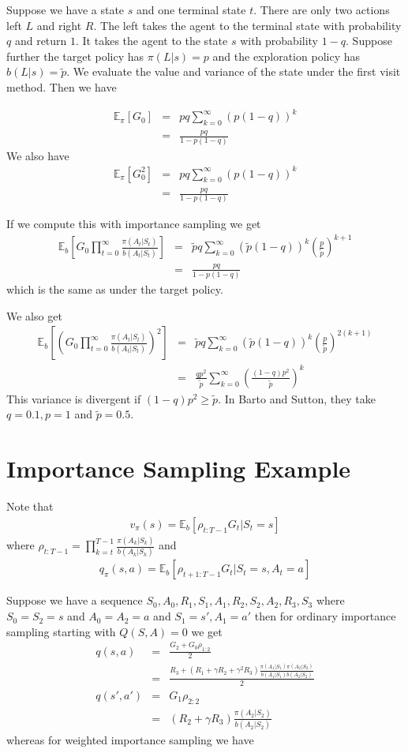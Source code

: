 \documentclass[11pt,a4paper]{article}
\newcommand\bea{\begin{eqnarray}}
\newcommand\eea{\end{eqnarray}}
\newcommand{\nn}{\nonumber \\}
\begin{document}
Suppose we have a state $s$ and one terminal state $t$. There are only two actions left $L$ and right $R$. The left takes the agent to the terminal state with probability $q$ and return $1$. It takes the agent to the state $s$ with probability $1-q$. Suppose further the target policy has $\pi(L|s)=p$ and the exploration policy has $b(L|s)=\tilde p$. We evaluate the value and variance of the state under the first visit method. Then we have

\bea
\mathbb E_\pi[G_0] &=& pq \sum_{k=0}^\infty (p (1-q))^k \nn
&=& \frac{pq}{1-p(1-q)}
\eea
We also have
\bea
\mathbb E_\pi[G_0^2] &=& pq \sum_{k=0}^\infty (p (1-q))^k \nn
&=& \frac{pq}{1-p(1-q)}
\eea

If we compute this with importance sampling we get
\bea
\mathbb E_b[G_0 \prod_{t=0}^\infty \frac{\pi(A_t|S_t)}{b(A_t|S_t)}] &=& \tilde pq \sum_{k=0}^\infty (\tilde p (1-q))^k \left( \frac{p}{\tilde p} \right)^{k+1} \nn
&=& \frac{pq}{1-p(1-q)}
\eea
which is the same as under the target policy.

We also get
\bea
\mathbb E_b[\left(G_0 \prod_{t=0}^\infty \frac{\pi(A_t|S_t)}{b(A_t|S_t)}\right)^2] &=& \tilde pq \sum_{k=0}^\infty (\tilde p (1-q))^k \left( \frac{p}{\tilde p} \right)^{2(k+1)} \nn
&=& \frac{qp^2}{\tilde p} \sum_{k=0}^\infty \left( \frac{(1-q) p^2}{\tilde p}\right)^k
\eea
This variance is divergent if $(1-q)p^2 \ge \tilde p$. In Barto and Sutton, they take $q=0.1, p=1$ and $\tilde p=0.5$.







\section{Importance Sampling Example}
Note that
\bea
v_\pi(s) = \mathbb E_b [ \rho_{t:T-1} G_t | S_t=s]
\eea
where $\rho_{t:T-1} = \prod_{k=t}^{T-1} \frac{\pi(A_k|S_k)}{b(A_k|S_k)}$ and
\bea
q_\pi(s,a) = \mathbb E_b [ \rho_{t+1:T-1} G_t | S_t=s, A_t=a]
\eea


Suppose we have a sequence $S_0,A_0,R_1,S_1,A_1,R_2,S_2,A_2,R_3,S_3$ where $S_0=S_2=s$ and $A_0=A_2=a$ and $S_1=s',A_1=a'$ then for ordinary importance sampling starting with $Q(S,A)=0$ we get
\bea
q(s,a) &=& \frac{G_2 + G_0 \rho_{1:2}}{2} \nn
&=&  \frac{ R_3 + (R_1 + \gamma R_2 + \gamma^2 R_3) \frac{\pi(A_1|S_1)\pi(A_2|S_2)}{b(A_1|S_1)b(A_2|S_2)}}{2} \\
q(s',a') &=& G_1 \rho_{2:2} \nn
&=& (R_2 + \gamma R_3) \frac{\pi(A_2|S_2)}{b(A_2|S_2)}
\eea
whereas for weighted importance sampling we have
\end{document}
